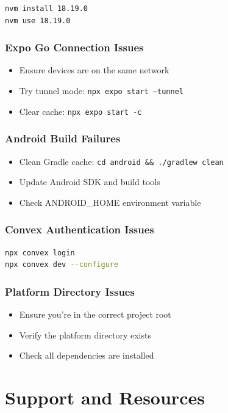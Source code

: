 \documentclass[a4paper,12pt]{article}
\begin{document}
\begin{lstlisting}[language=bash]
nvm install 18.19.0
nvm use 18.19.0
\end{lstlisting}

\subsubsection{Expo Go Connection Issues}
\begin{itemize}
    \item Ensure devices are on the same network
    \item Try tunnel mode: \texttt{npx expo start --tunnel}
    \item Clear cache: \texttt{npx expo start -c}
\end{itemize}

\subsubsection{Android Build Failures}
\begin{itemize}
    \item Clean Gradle cache: \texttt{cd android \&\& ./gradlew clean}
    \item Update Android SDK and build tools
    \item Check ANDROID\_HOME environment variable
\end{itemize}

\subsubsection{Convex Authentication Issues}
\begin{lstlisting}[language=bash]
npx convex login
npx convex dev --configure
\end{lstlisting}

\subsubsection{Platform Directory Issues}
\begin{itemize}
    \item Ensure you're in the correct project root
    \item Verify the platform directory exists
    \item Check all dependencies are installed
\end{itemize}

\section{Support and Resources}
\end{document}
